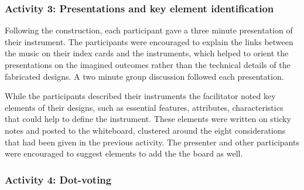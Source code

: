 \documentclass[letterpaper, 12pt]{article}
\begin{document}


\subsubsection{Activity 3: Presentations and key element identification}
\label{ch3-sec:activity-3-presentations}

Following the construction, each participant gave a three minute presentation of their instrument. 
The participants were encouraged to explain the links between the music on their index cards and the instruments, which helped to orient the presentations on the imagined outcomes rather than the technical details of the fabricated designs. A two minute group discussion followed each presentation. 

While the participants described their instruments the facilitator noted key elements of their designs, such as essential features, attributes, characteristics that could help to define the instrument. These elements were written on sticky notes and posted to the whiteboard, clustered around the eight considerations that had been given in the previous activity. The presenter and other participants were encouraged to suggest elements to add the the board as well. 

\subsubsection{Activity 4: Dot-voting}
\label{ch3-sec:activity-4-dot-voting}
\end{document}
